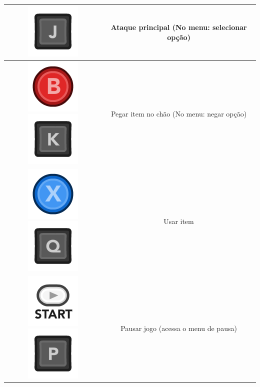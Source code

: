 \documentclass{article}
\begin{document}
\begin{longtable}{|c|c|}
\includegraphics[scale=0.3]{images/kJ.png}
& Ataque principal (No menu: selecionar opção)
\\
\hline
\includegraphics[scale=0.3]{images/360_B.png}
\includegraphics[scale=0.3]{images/kK.png}
& Pegar item no chão (No menu: negar opção)
\\
\hline
\includegraphics[scale=0.3]{images/360_X.png}
\includegraphics[scale=0.3]{images/kQ.png}
& Usar item 
\\
\hline
\includegraphics[scale=0.3]{images/360_Start.png}
\includegraphics[scale=0.3]{images/kP.png}
& Pausar jogo (acessa o menu de pausa) 
\\
\hline
\end{longtable}
\newpage
\end{document}
